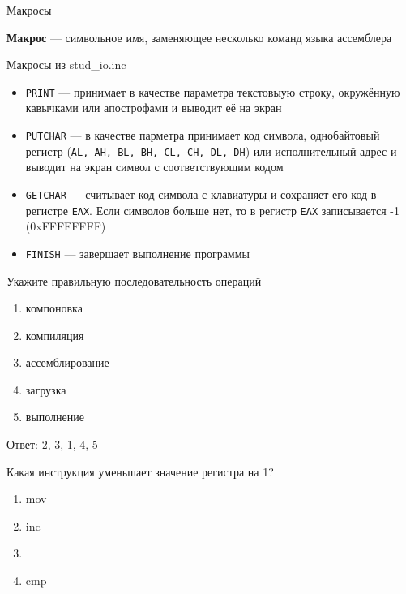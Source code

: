 \documentclass{beamer}
\begin{document}
    \begin{frame}{Макросы}

    {\bf Макрос} --- символьное имя, заменяющее несколько команд языка ассемблера

    \begin{block}{Макросы из stud\_io.inc}
        \begin{itemize}
            \item {\tt PRINT} --- принимает в качестве параметра текстовыую строку, окружённую кавычками или апострофами и выводит её на экран
            \item {\tt PUTCHAR} --- в качестве парметра принимает код символа, однобайтовый регистр ({\tt AL, AH, BL, BH, CL, CH, DL, DH}) или исполнительный адрес и выводит на экран символ с соответствующим кодом
            \item {\tt GETCHAR} --- считывает код символа с клавиатуры и сохраняет его код в регистре {\tt EAX}. Если символов больше нет, то в регистр {\tt EAX} записывается -1 (0xFFFFFFFF)
            \item {\tt FINISH} --- завершает выполнение программы
        \end{itemize}
    \end{block}
    \end{frame}
    \begin{frame}
    \begin{block}{Укажите правильную последовательность операций}
        \begin{enumerate}
            \item компоновка
            \item компиляция
            \item ассемблирование
            \item загрузка
            \item выполнение
        \end{enumerate}
        \pause
        Ответ: 2, 3, 1, 4, 5
    \end{block}
    \pause
    \begin{block}{Какая инструкция уменьшает значение регистра на 1?}
        \begin{enumerate}
            \item mov
            \item inc
            \item {}
            \item cmp
        \end{enumerate}
    \end{block}
    \end{frame}
\end{document}
